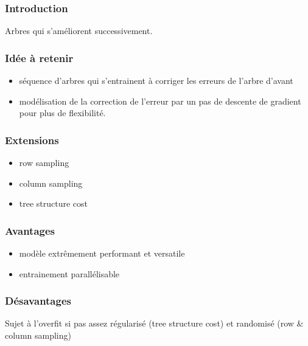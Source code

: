 \begin{frame}
  \frametitle{Introduction}
  Arbres qui s'améliorent successivement.
\end{frame}

\begin{frame}
  \frametitle{Idée à retenir}
  \begin{itemize}
  \item séquence d'arbres qui s'entrainent à corriger les erreurs de
    l'arbre d'avant
  \item modélisation de la correction de l'erreur par un pas de
    descente de gradient pour plus de flexibilité.
  \end{itemize}
   
\end{frame}

\begin{frame}
  \frametitle{Extensions}
  \begin{itemize}
  \item row sampling
  \item column sampling
  \item tree structure cost
  \end{itemize}
\end{frame}

\begin{frame}
  \frametitle{Avantages}
  \begin{itemize}
  \item modèle extrêmement performant et versatile
  \item entrainement parallélisable
  \end{itemize}
\end{frame}

\begin{frame}
  \frametitle{Désavantages}
  Sujet à l'overfit si pas assez régularisé (tree structure cost) et
  randomisé (row \& column sampling)
\end{frame}
